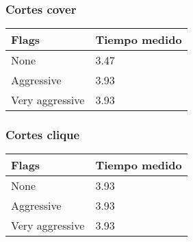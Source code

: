\subsubsection{Cortes cover}

    \begin{center}
        \begin{tabular}{ | m{7em} | m{5cm} | }
        \hline
        Flags  & Tiempo medido \\
        \hline
        None  & 3.47 \\
        \hline
        Aggressive  & 3.93 \\
        \hline
        Very aggressive  & 3.93 \\
        \hline
        \end{tabular}
    \end{center}

\subsubsection{Cortes clique}

    \begin{center}
        \begin{tabular}{ | m{7em} | m{5cm} | }
        \hline
        Flags  & Tiempo medido \\
        \hline
        None  & 3.93 \\
        \hline
        Aggressive  & 3.93 \\
        \hline
        Very aggressive  & 3.93 \\
        \hline
        \end{tabular}
    \end{center}
